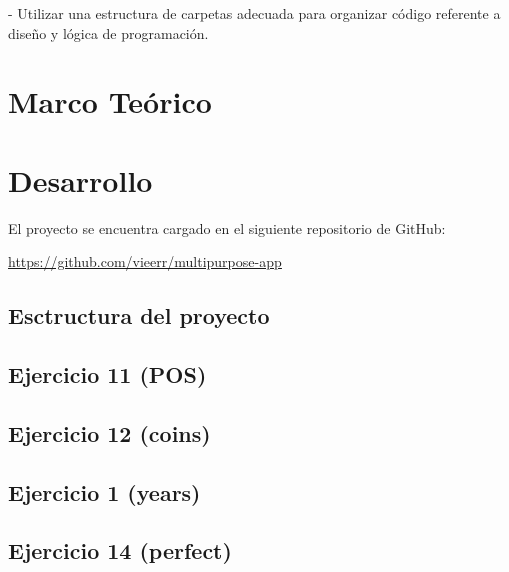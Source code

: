 \documentclass[12pt,letterpaper]{article}
\begin{document}
- Utilizar una estructura de carpetas adecuada para organizar código referente a diseño y lógica de programación.


\section{Marco Teórico}



\section{Desarrollo}

El proyecto se encuentra cargado en el siguiente repositorio de GitHub: 

\href{https://github.com/vieerr/multipurpose-app}{\color{blue}\underline{https://github.com/vieerr/multipurpose-app}}

\subsection{Esctructura del proyecto}


\subsection{Ejercicio 11 (POS)}


\subsection{Ejercicio 12 (coins)}


\subsection{Ejercicio 1 (years)}


\subsection{Ejercicio 14 (perfect)}

\end{document}
